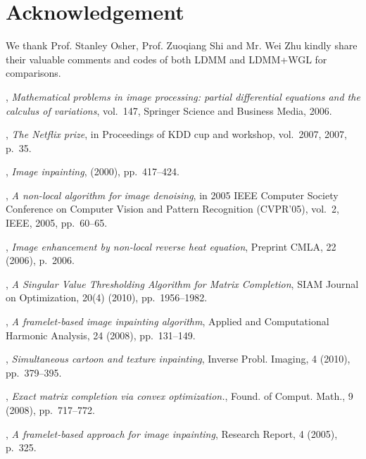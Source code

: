 \documentclass[letterpaper,10pt]{article}
\begin{document}
\section*{Acknowledgement} We thank Prof. Stanley Osher, Prof. Zuoqiang Shi and Mr. Wei Zhu kindly share their valuable comments and codes of both LDMM and LDMM+WGL for comparisons.

\begin{thebibliography}{10}

, {\em Mathematical problems in image
  processing: partial differential equations and the calculus of variations},
  vol.~147, Springer Science and Business Media, 2006.

, {\em The {N}etflix prize}, in Proceedings of
  KDD cup and workshop, vol.~2007, 2007, p.~35.

, {\em {Image
  inpainting}},  (2000), pp.~417--424.

, {\em A non-local algorithm for image
  denoising}, in 2005 IEEE Computer Society Conference on Computer Vision and
  Pattern Recognition (CVPR'05), vol.~2, IEEE, 2005, pp.~60--65.

\leavevmode\vrule height 2pt depth -1.6pt width 23pt, {\em Image enhancement by
  non-local reverse heat equation}, Preprint CMLA, 22 (2006), p.~2006.

, {\em {A Singular Value
  Thresholding Algorithm for Matrix Completion}}, SIAM Journal on Optimization,
  20(4) (2010), pp.~1956--1982.

, {\em {A framelet-based image inpainting
  algorithm}}, Applied and Computational Harmonic Analysis, 24 (2008),
  pp.~131--149.

, {\em Simultaneous cartoon and texture
  inpainting}, Inverse Probl. Imaging, 4 (2010), pp.~379--395.

, {\em Exact matrix completion via convex
  optimization.}, Found. of Comput. Math., 9 (2008), pp.~717--772.

, {\em {A framelet-based approach for
  image inpainting}}, Research Report, 4 (2005), p.~325.


\end{thebibliography}
\end{document}
